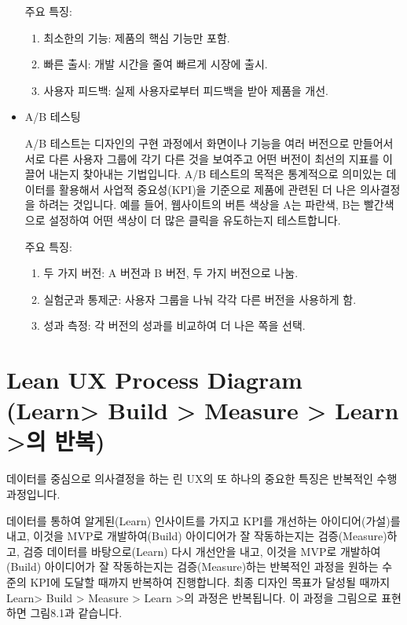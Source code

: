 \documentclass[
  letterpaper,
]{book}
\providecommand{\tightlist}{%
  \setlength{\itemsep}{0pt}\setlength{\parskip}{0pt}}\usepackage{longtable,booktabs,array}
\begin{document}
\begin{itemize}
  주요 특징:

  \begin{enumerate}
  \def\labelenumi{\arabic{enumi}.}
  \tightlist
  \item
    최소한의 기능: 제품의 핵심 기능만 포함.
  \item
    빠른 출시: 개발 시간을 줄여 빠르게 시장에 출시.
  \item
    사용자 피드백: 실제 사용자로부터 피드백을 받아 제품을 개선.
  \end{enumerate}
\item
  A/B 테스팅

  A/B 테스트는 디자인의 구현 과정에서 화면이나 기능을 여러 버전으로
  만들어서 서로 다른 사용자 그룹에 각기 다른 것을 보여주고 어떤 버전이
  최선의 지표를 이끌어 내는지 찾아내는 기법입니다. A/B 테스트의 목적은
  통계적으로 의미있는 데이터를 활용해서 사업적 중요성(KPI)을 기준으로
  제품에 관련된 더 나은 의사결정을 하려는 것입니다. 예를 들어,
  웹사이트의 버튼 색상을 A는 파란색, B는 빨간색으로 설정하여 어떤 색상이
  더 많은 클릭을 유도하는지 테스트합니다.

  주요 특징:

  \begin{enumerate}
  \def\labelenumi{\arabic{enumi}.}
  \tightlist
  \item
    두 가지 버전: A 버전과 B 버전, 두 가지 버전으로 나눔.
  \item
    실험군과 통제군: 사용자 그룹을 나눠 각각 다른 버전을 사용하게 함.
  \item
    성과 측정: 각 버전의 성과를 비교하여 더 나은 쪽을 선택.
  \end{enumerate}
\end{itemize}

\section{Lean UX Process Diagram (Learn\textgreater{} Build
\textgreater{} Measure \textgreater{} Learn \textgreater 의
반복)}\label{lean-ux-process-diagram-learn-build-measure-learn-uxc758-uxbc18uxbcf5}

데이터를 중심으로 의사결정을 하는 린 UX의 또 하나의 중요한 특징은
반복적인 수행 과정입니다.

데이터를 통하여 알게된(Learn) 인사이트를 가지고 KPI를 개선하는
아이디어(가설)를 내고, 이것을 MVP로 개발하여(Build) 아이디어가 잘
작동하는지는 검증(Measure)하고, 검증 데이터를 바탕으로(Learn) 다시
개선안을 내고, 이것을 MVP로 개발하여(Build) 아이디어가 잘 작동하는지는
검증(Measure)하는 반복적인 과정을 원하는 수준의 KPI에 도달할 때까지
반복하여 진행합니다. 최종 디자인 목표가 달성될 때까지
Learn\textgreater{} Build \textgreater{} Measure \textgreater{} Learn
\textgreater 의 과정은 반복됩니다. 이 과정을 그림으로 표현하면 그림8.1과
같습니다.
\end{document}
